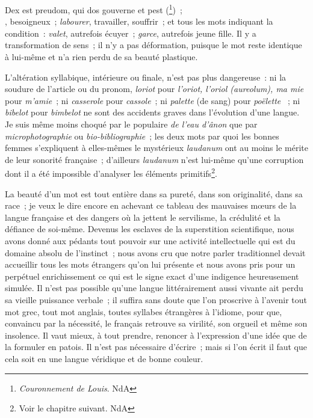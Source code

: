 \documentclass[french,twoside]{book} %
\begin{document}
Dex est preudom, qui dos gouverne et pest (\footnote{ {\itshape Couronnement de Louis}. NdA}) ;\\

, besoigneux ; {\itshape labourer}, travailler, souffrir ; et tous les mots indiquant la condition : {\itshape valet}, autrefois écuyer ; {\itshape garce}, autrefois jeune fille. Il y a transformation de sens ; il n’y a pas déformation, puisque le mot reste identique à lui-même et n’a rien perdu de sa beauté plastique.\par
L’altération syllabique, intérieure ou finale, n’est pas plus dangereuse : ni la soudure de l’article ou du pronom, {\itshape loriot} pour {\itshape l’oriot, l’oriol (aureolum), ma mie} pour {\itshape m’amie} ; ni {\itshape casserole} pour {\itshape cassole} ; ni {\itshape palette} (de sang) pour {\itshape poëlette}  ; ni {\itshape bibelot} pour {\itshape bimbelot} ne sont des accidents graves dans l’évolution d’une langue. Je suis même moins choqué par le populaire {\itshape de l’eau d’ânon} que par {\itshape microphotographie} ou {\itshape bio-bibliographie} ; les deux mots par quoi les bonnes femmes s’expliquent à elles-mêmes le mystérieux {\itshape laudanum} ont au moins le mérite de leur sonorité française ; d’ailleurs {\itshape laudanum} n’est lui-même qu’une corruption dont il a été impossible d’analyser les éléments primitifs\footnote{Voir le chapitre suivant. NdA}.\par
La beauté d’un mot est tout entière dans sa pureté, dans son originalité, dans sa race ; je veux le dire encore en achevant ce tableau des mauvaises mœurs de la langue française et des dangers où la jettent le servilisme, la crédulité et la défiance de soi-même. Devenus les esclaves de la superstition scientifique, nous avons donné aux pédants tout pouvoir sur une activité intellectuelle qui est du domaine absolu de l’instinct ; nous avons cru que notre parler traditionnel devait accueillir tous les mots étrangers qu’on lui présente et nous avons pris pour un perpétuel enrichissement ce qui est le signe exact d’une indigence heureusement simulée. Il n’est pas possible qu’une langue littérairement aussi vivante ait perdu sa vieille puissance verbale ; il suffira sans doute que l’on proscrive à l’avenir tout mot grec, tout mot anglais, toutes syllabes étrangères à l’idiome, pour que, convaincu par la nécessité, le français retrouve sa virilité, son orgueil et même son insolence. Il vaut mieux, à tout prendre, renoncer à l’expression d’une idée que de la formuler en patois. Il n’est pas nécessaire d’écrire ; mais si l’on écrit il faut que cela soit en une langue véridique et de bonne couleur.\par
\end{document}
